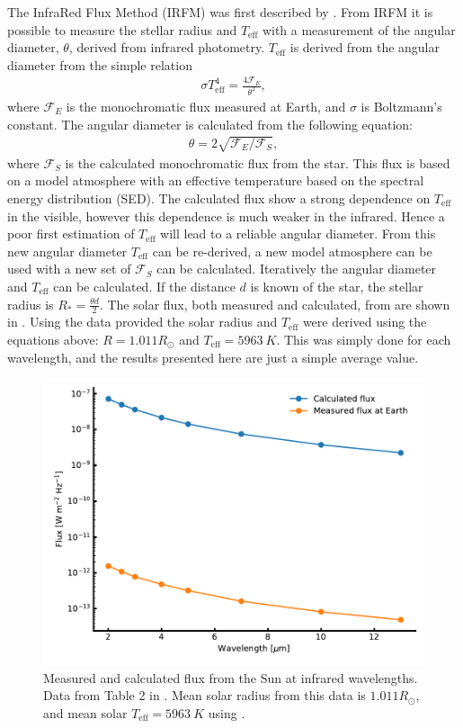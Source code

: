 The InfraRed Flux Method (IRFM) was first described by \citet{Blackwell1977}. From IRFM it is
possible to measure the stellar radius and $T_\mathrm{eff}$ with a measurement of the angular
diameter, $\theta$, derived from infrared photometry. $T_\mathrm{eff}$ is derived from the angular
diameter from the simple relation
\begin{align}
  \sigma T_\mathrm{eff}^4 = \frac{4\mathcal{F}_E}{\theta^2}, \label{eq:irfm}
\end{align}
where $\mathcal{F}_E$ is the monochromatic flux measured at Earth, and $\sigma$ is Boltzmann's
constant. The angular diameter is calculated from the following equation:
\begin{align}
  \theta = 2\sqrt{\mathcal{F}_E/\mathcal{F}_S},
\end{align}
where $\mathcal{F}_S$ is the calculated monochromatic flux from the star. This flux is based on a
model atmosphere with an effective temperature based on the spectral energy distribution (SED). The
calculated flux show a strong dependence on $T_\mathrm{eff}$ in the visible, however this dependence
is much weaker in the infrared. Hence a poor first estimation of $T_\mathrm{eff}$ will lead to a
reliable angular diameter. From this new angular diameter $T_\mathrm{eff}$ can be re-derived, a new
model atmosphere can be used with a new set of $\mathcal{F}_S$ can be calculated. Iteratively the
angular diameter and $T_\mathrm{eff}$ can be calculated. If the distance $d$ is known of the star,
the stellar radius is $R_\ast = \frac{\theta d}{2}$. The solar flux, both measured and calculated,
from \citet{Blackwell1977} are shown in . Using the data provided the solar radius
and $T_\mathrm{eff}$ were derived using the equations above: $R=1.011R_\odot$ and
$T_\mathrm{eff}=\SI{5963}{K}$. This was simply done for each wavelength, and the results presented
here are just a simple average value.

\begin{figure}[htpb!]
    \centering
    \includegraphics[width=0.85\linewidth]{figures/IRFM.pdf}
    \caption{Measured and calculated flux from the Sun at infrared wavelengths. Data from Table 2 in
             \citet{Blackwell1977}. Mean solar radius from this data is $1.011R_\odot$, and mean
             solar $T_\mathrm{eff}=\SI{5963}{K}$ using .}
    \label{fig:IRFM}
\end{figure}

